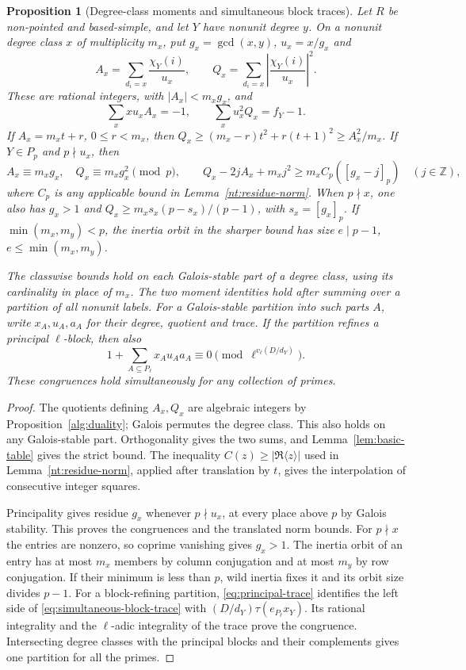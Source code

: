 \documentclass[11pt]{amsart}
\numberwithin{equation}{section}
\newtheorem{proposition}[theorem]{Proposition}
\theoremstyle{definition}
\theoremstyle{plain}
\begin{document}
\begin{proposition}[Degree-class moments and simultaneous block traces]\label{new:block-census}\label{new:cross-block-traces}
Let $R$ be non-pointed and based-simple, and let $Y$ have nonunit
degree $y$. On a nonunit degree class $x$ of multiplicity $m_x$, put
$g_x=\gcd(x,y)$, $u_x=x/g_x$ and
\[
 A_x=\sum_{d_i=x}\frac{\chi_Y(i)}{u_x},\qquad
 Q_x=\sum_{d_i=x}\left|\frac{\chi_Y(i)}{u_x}\right|^2.
\]
These are rational integers, with $|A_x|<m_xg_x$, and
\[
 \sum_x xu_x A_x=-1,\qquad \sum_xu_x^2Q_x=f_Y-1.
\]
If $A_x=m_xt+r$, $0\le r<m_x$, then
$Q_x\ge(m_x-r)t^2+r(t+1)^2\ge A_x^2/m_x$.
If $Y\in P_p$ and $p\nmid u_x$, then
\[
 A_x\equiv m_xg_x,\quad Q_x\equiv m_xg_x^2\pmod p,
 \qquad
 Q_x-2jA_x+m_xj^2\ge m_xC_p([g_x-j]_p)\quad(j\in\mathbb Z),
\]
where $C_p$ is any applicable bound in Lemma~\ref{nt:residue-norm}.
When $p\nmid x$, one also has $g_x>1$ and
$Q_x\ge m_xs_x(p-s_x)/(p-1)$, with $s_x=[g_x]_p$.
If $\min(m_x,m_y)<p$, the inertia orbit in the sharper bound has
size $e\mid p-1$, $e\le\min(m_x,m_y)$.

The classwise bounds hold on each Galois-stable part of a degree
class, using its cardinality in place of $m_x$. The two moment
identities hold after summing over a partition of all nonunit
labels. For a Galois-stable partition into such parts $A$, write
$x_A,u_A,a_A$ for their
degree, quotient and trace. If the partition refines a principal
$\ell$-block, then also
\begin{equation}\label{eq:simultaneous-block-trace}
 1+\sum_{A\subseteq P_\ell}x_Au_Aa_A
       \equiv0\pmod{\ell^{v_\ell(D/d_Y)}}.
\end{equation}
These congruences hold simultaneously for any collection of primes.
\end{proposition}
\begin{proof}
The quotients defining $A_x,Q_x$ are algebraic integers by
Proposition~\ref{alg:duality}; Galois permutes the degree class.
This also holds on any Galois-stable part. Orthogonality gives
the two sums, and Lemma~\ref{lem:basic-table} gives the strict bound.
The inequality $C(z)\ge|\Re\langle z\rangle|$ used in
Lemma~\ref{nt:residue-norm}, applied after translation by $t$, gives
the interpolation of consecutive integer squares.

Principality gives residue $g_x$ whenever $p\nmid u_x$, at every
place above $p$ by Galois stability. This proves the congruences and
the translated norm bounds. For $p\nmid x$ the entries are nonzero,
so coprime vanishing gives $g_x>1$. The inertia orbit of an entry
has at most $m_x$ members by column conjugation and at most $m_y$
by row conjugation. If their minimum is less than $p$, wild inertia
fixes it and its orbit size divides $p-1$.
For a block-refining partition, \eqref{eq:principal-trace} identifies
the left side of \eqref{eq:simultaneous-block-trace} with
$(D/d_Y)\tau(e_{P_\ell}x_Y)$. Its rational integrality and the
$\ell$-adic integrality of the trace prove the congruence.
Intersecting degree classes with the principal blocks and their
complements gives one partition for all the primes.
\end{proof}
\end{document}
